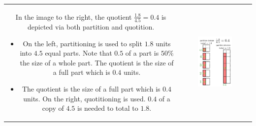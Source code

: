 \documentclass{article}
\begin{document}
\vspace{5mm}


\begin{tabular}{cc}
\parbox{0.4\textwidth}{
In the image to the right, the quotient \(\frac{1.8}{4.5} = 0.4\) is depicted via both partition and quotition. 
\begin{itemize}
\item On the left, partitioning is used to split \(1.8\) units into \(4.5\) equal parts. Note that \(0.5\) of a part is \(50\%\) the size of a whole part. The quotient is the size of a full part which is \(0.4\) units.
\item The quotient is the size of a full part which is \(0.4\) units. On the right, quotitioning is used. \(0.4\) of a copy of \(4.5\) is needed to total to \(1.8\). 
\end{itemize}
}
& \parbox{0.5\textwidth}{
\includegraphics[width = 0.5\textwidth]{1p8_div_4p5}
}
\end{tabular}

\vspace{5mm}

\end{document}
